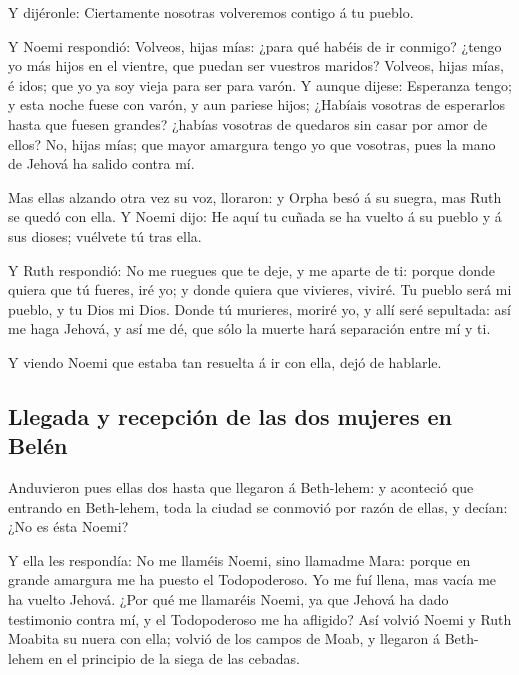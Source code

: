  Y dijéronle: Ciertamente nosotras volveremos contigo á tu
pueblo.

 Y Noemi respondió: Volveos, hijas mías: ¿para qué habéis
de ir conmigo? ¿tengo yo más hijos en el vientre, que puedan ser
vuestros maridos?  Volveos, hijas mías, é idos; que yo ya
soy vieja para ser para varón. Y aunque dijese: Esperanza tengo; y esta
noche fuese con varón, y aun pariese hijos;  ¿Habíais
vosotras de esperarlos hasta que fuesen grandes? ¿habías vosotras de
quedaros sin casar por amor de ellos? No, hijas mías; que mayor amargura
tengo yo que vosotras, pues la mano de Jehová ha salido contra mí.

 Mas ellas alzando otra vez su voz, lloraron: y Orpha besó
á su suegra, mas Ruth se quedó con ella.  Y Noemi dijo: He
aquí tu cuñada se ha vuelto á su pueblo y á sus dioses; vuélvete tú tras
ella.

 Y Ruth respondió: No me ruegues que te deje, y me aparte
de ti: porque donde quiera que tú fueres, iré yo; y donde quiera que
vivieres, viviré. Tu pueblo será mi pueblo, y tu Dios mi Dios.
 Donde tú murieres, moriré yo, y allí seré sepultada: así
me haga Jehová, y así me dé, que sólo la muerte hará separación entre mí
y ti.

 Y viendo Noemi que estaba tan resuelta á ir con ella, dejó
de hablarle.

\hypertarget{llegada-y-recepciuxf3n-de-las-dos-mujeres-en-beluxe9n}{%
\subsection{Llegada y recepción de las dos mujeres en
Belén}\label{llegada-y-recepciuxf3n-de-las-dos-mujeres-en-beluxe9n}}

 Anduvieron pues ellas dos hasta que llegaron á Beth-lehem:
y aconteció que entrando en Beth-lehem, toda la ciudad se conmovió por
razón de ellas, y decían: ¿No es ésta Noemi?

 Y ella les respondía: No me llaméis Noemi, sino llamadme
Mara: porque en grande amargura me ha puesto el Todopoderoso.
 Yo me fuí llena, mas vacía me ha vuelto Jehová. ¿Por qué
me llamaréis Noemi, ya que Jehová ha dado testimonio contra mí, y el
Todopoderoso me ha afligido?  Así volvió Noemi y Ruth
Moabita su nuera con ella; volvió de los campos de Moab, y llegaron á
Beth-lehem en el principio de la siega de las cebadas.

